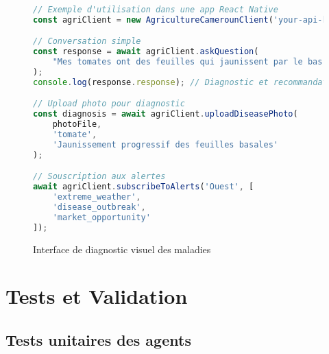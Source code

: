 \begin{figure}[h]
\begin{lstlisting}[language=JavaScript, caption=Intégration JavaScript de l'API]
// Exemple d'utilisation dans une app React Native
const agriClient = new AgricultureCamerounClient('your-api-key');

// Conversation simple
const response = await agriClient.askQuestion(
    "Mes tomates ont des feuilles qui jaunissent par le bas"
);
console.log(response.response); // Diagnostic et recommandations

// Upload photo pour diagnostic
const diagnosis = await agriClient.uploadDiseasePhoto(
    photoFile,
    'tomate',
    'Jaunissement progressif des feuilles basales'
);

// Souscription aux alertes
await agriClient.subscribeToAlerts('Ouest', [
    'extreme_weather',
    'disease_outbreak',
    'market_opportunity'
]);
\end{lstlisting}
\end{figure}

\begin{figure}[h]
\centering
{}
\caption{Interface de diagnostic visuel des maladies}
\end{figure}

\section{Tests et Validation}

\subsection{Tests unitaires des agents}

